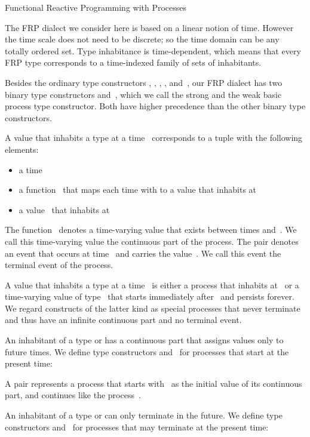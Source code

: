 \documentclass[copyright,creativecommons]{eptcs}
\begin{document}
           {Functional Reactive Programming with Processes}

The FRP dialect we consider here is based on a linear notion of time. However
the time scale does not need to be discrete; so the time domain can be any
totally ordered set. Type inhabitance is time-dependent, which means that every
FRP type corresponds to a time-indexed family of sets of inhabitants.

Besides the ordinary type constructors , , , , and~, our FRP
dialect has two binary type constructors  and~, which we call the
strong and the weak basic process type constructor. Both have higher precedence
than the other binary type constructors.

A value that inhabits a type  at a time~ corresponds to a tuple
with the following elements:
\begin{itemize}

\item

a time~

\item

a function~ that maps each time  with  to a value that
inhabits  at~

\item

a value~ that inhabits  at~

\end{itemize}
The function~ denotes a time-varying value that exists between times 
and~. We call this time-varying value the continuous part of the process.
The pair  denotes an event that occurs at time~ and carries the
value~. We call this event the terminal event of the process.

A value that inhabits a type  at a time~ is either a process that
inhabits  at~ or a time-varying value of type~ that starts
immediately after~ and persists forever. We regard constructs of the latter
kind as special processes that never terminate and thus have an infinite
continuous part and no terminal event.


An inhabitant of a type  or  has a continuous part that
assigns values only to future times. We define type constructors  and~
for processes that start at the present time:

A pair  represents a process that starts with~ as the initial value
of its continuous part, and continues like the process~.

An inhabitant of a type  or  can only terminate in the
future. We define type constructors  and~ for processes that may
terminate at the present time:
\end{document}
